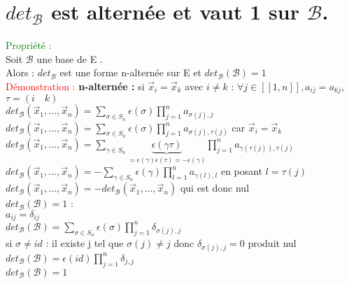 \documentclass{article}
\begin{document}
	\section{$det_{\mathcal B}$ est alternée et vaut 1 sur $\mathcal B$.}
	\textcolor{green}{Propriété :} \\
	Soit $\mathcal B$ une base de E . \\
	Alors : $det_{\mathcal{B}}$ est une forme n-alternée sur E et $det_{\mathcal B}(\mathcal B)=1$ \\
	\textcolor{red}{Démonstration :}
	{\bf n-alternée :} si $\vec x_i= \vec x_k$ avec $i\neq k$ :
	$\forall j \in [[1,n]],a_{ij}=a_{kj}$, $\tau=( i \quad k)$ \\
	$det_{\mathcal B}(\vec x_1,..., \vec x_n) = \sum_{\sigma \in S_n} \epsilon(\sigma) \prod_{j=1}^n a_{\sigma(j),j}$ \\
	$det_{\mathcal B}(\vec x_1,..., \vec x_n) = \sum_{\sigma \in S_n} \epsilon(\sigma) \prod_{j=1}^n   a_{\sigma(j),\tau(j)}$ car $\vec x_i= \vec x_k$ \\
	$det_{\mathcal B}(\vec x_1,..., \vec x_n) = \sum_{\gamma \in S_n} \underbrace{\epsilon(\gamma \tau)}_{=\epsilon(\gamma)\epsilon(\tau)=-\epsilon(\gamma)} \prod_{j=1}^n a_{\gamma(\tau(j)),\tau(j)}$ \\
	$det_{\mathcal B}(\vec x_1,..., \vec x_n) = - \sum_{\gamma \in S_n} \epsilon(\gamma) \prod_{l=1}^n a_{\gamma(l),l}$ en posant $l=\tau(j)$ \\
	$det_{\mathcal B}(\vec x_1,..., \vec x_n) = -det_{\mathcal B}(\vec x_1,...,\vec x_n) $ qui est donc nul \\
	{\boldmath $det_{\mathcal B}(\mathcal B)=1$ :} \\
	$a_{ij}=\delta_{ij}$ \\
		$det_{\mathcal B}(\mathcal B)= \sum_{\sigma \in S_n} \epsilon(\sigma) \prod_{j=1}^n \delta_{\sigma(j),j}$ \\
	si $\sigma\neq id$ : il existe j tel que $\sigma(j)\neq j$ donc $\delta_{\sigma(j),j}=0$ produit nul \\
	$det_{\mathcal B}(\mathcal B)= \epsilon(id) \prod_{j=1}^n \delta_{j,j}$ \\
	$det_{\mathcal B}(\mathcal B)= 1$
\end{document}
